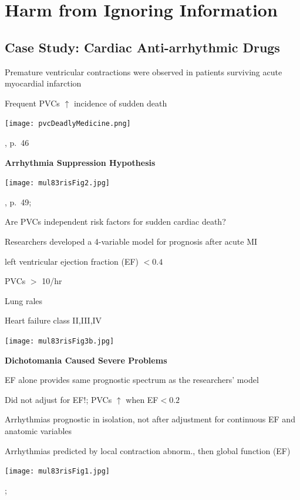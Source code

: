 \section{Harm from Ignoring Information}
\subsection{Case Study: Cardiac Anti-arrhythmic Drugs}\label{sec:pvcs}
\bi
\item Premature ventricular contractions were observed in patients
surviving acute myocardial infarction
\item Frequent PVCs $\uparrow$ incidence of sudden death
\ei

\centerline{\texttt{[image: pvcDeadlyMedicine.png]}}
\citet{moo95dea}, p.\ 46

\textbf{Arrhythmia Suppression Hypothesis}


\centerline{\texttt{[image: mul83risFig2.jpg]}}
\citet{moo95dea}, p.~49; \cite{mul83ris}

Are PVCs independent risk factors for sudden cardiac death?

Researchers developed a 4-variable model for prognosis after acute MI
 \bi
 \item left ventricular ejection fraction (EF) $< 0.4$
 \item PVCs $>$ 10/hr
 \item Lung rales
 \item Heart failure class II,III,IV
 \ei

\centerline{\texttt{[image: mul83risFig3b.jpg]}}
\citet{mul83ris}

\textbf{Dichotomania Caused Severe Problems}
\bi
\item EF alone provides same prognostic spectrum as the researchers'
model
\item Did not adjust for EF!; PVCs $\uparrow$ when EF$<0.2$
\item Arrhythmias prognostic in isolation, not after
adjustment for continuous EF and anatomic variables
\item Arrhythmias predicted by local contraction
abnorm., then global function (EF)
\ei

\centerline{\texttt{[image: mul83risFig1.jpg]}}
\citet{mul83ris}; \citet{cal82pro}

